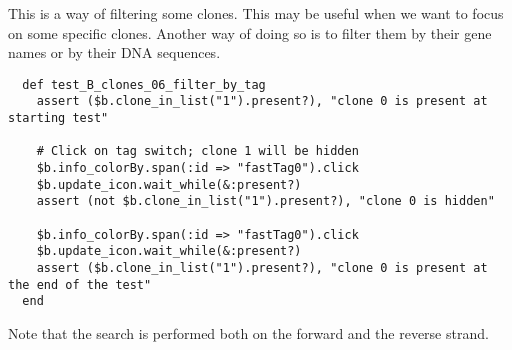 This is a way of filtering some clones. This may be useful when we want to
focus on some specific clones. Another way of doing so is to filter them by
their gene names or by their DNA sequences.  


\begin{verbatim}
  def test_B_clones_06_filter_by_tag
    assert ($b.clone_in_list("1").present?), "clone 0 is present at starting test"

    # Click on tag switch; clone 1 will be hidden
    $b.info_colorBy.span(:id => "fastTag0").click
    $b.update_icon.wait_while(&:present?)
    assert (not $b.clone_in_list("1").present?), "clone 0 is hidden"

    $b.info_colorBy.span(:id => "fastTag0").click
    $b.update_icon.wait_while(&:present?)
    assert ($b.clone_in_list("1").present?), "clone 0 is present at the end of the test"
  end
\end{verbatim}

Note that the search is performed both on the forward and the reverse strand.

